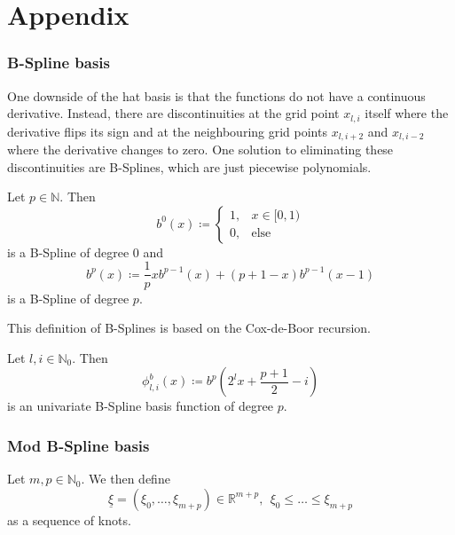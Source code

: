 \documentclass[
  a4paper,  %
  twoside,  %
  bibliography=totoc,
  headsepline,
  cleardoublepage=empty,
  parskip=half,
  draft=false
]{scrbook}
\begin{document}
\appendix
\chapter{Appendix}

\subsection{B-Spline basis}

One downside of the hat basis is that the functions do not have a continuous derivative.
Instead, there are discontinuities at the grid point $x_{l,i}$ itself where the derivative flips its sign and at the neighbouring grid points $x_{l,i+2}$ and $x_{l,i-2}$ where the derivative changes to zero.
One solution to eliminating these discontinuities are B-Splines, which are just piecewise polynomials.
\begin{definition}[B-Splines]
Let $p \in \mathds{N}$.
Then
\begin{equation}
b^0(x) \coloneqq
\begin{cases}
    1, & x \in [0,1) \\
   0, & \text{else}
\end{cases}
\end{equation}
is a B-Spline of degree $0$ and
\begin{equation}
b^p(x) \coloneqq \frac{1}{p} xb^{p-1}(x) + (p + 1 - x) b^{p-1}(x-1) 
\end{equation}
is a B-Spline of degree $p$.
\end{definition}
This definition of B-Splines is based on the Cox-de-Boor recursion.

\begin{definition}
Let $l,i \in \mathds{N}_0$.
Then
\begin{equation}
\phi^b_{l,i}(x) \coloneqq b^p \left( 2^l x + \frac{p+1}{2} -i \right)
\end{equation}
is an univariate B-Spline basis function of degree $p$.
\end{definition}

\subsection{Mod B-Spline basis}

\begin{definition}[Knots]
Let $m,p \in \mathds{N}_0$.
We then define
\begin{equation}
\underline{\xi}=(\xi_0, \dots, \xi_{m + p}) \in \mathds{R}^{m + p}, ~~ \xi_0 \leq \dots \leq \xi_{m + p}
\end{equation}
as a sequence of knots.
\end{definition}
\end{document}
